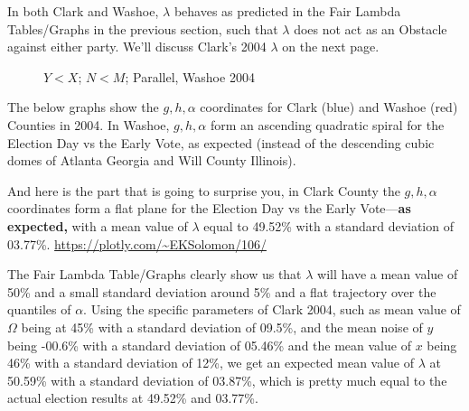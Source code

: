 In both Clark and Washoe, $\lambda$ behaves as predicted in the Fair Lambda Tables/Graphs in the previous section, such that $\lambda$ does not act as an Obstacle against either party. We'll discuss Clark's 2004 $\lambda$ on the next page.
\begin{figure}[bp!]
\begin{center}
\caption{$Y<X$; $N<M$; Parallel, Washoe 2004}
\noindent{}
\end{center}
\end{figure}
\newpage
The below graphs show the $g,h,\alpha$ coordinates for Clark (blue) and Washoe (red) Counties in 2004. In Washoe, $g,h,\alpha$ form an ascending quadratic spiral for the Election Day vs the Early Vote, as expected (instead of the descending cubic domes of Atlanta Georgia and Will County Illinois).

And here is the part that is going to surprise you, in Clark County the $g,h,\alpha$ coordinates form a flat plane for the Election Day vs the Early Vote---\textbf{as expected,} with a mean value of $\lambda$ equal to 49.52\% with a standard deviation of 03.77\%. \url{https://plotly.com/~EKSolomon/106/}

The Fair Lambda Table/Graphs clearly show us that $\lambda$ will have a mean value of 50\% and a small standard deviation around 5\% and a flat trajectory over the quantiles of $\alpha$. Using the specific parameters of Clark 2004, such as mean value of $\Omega$ being at 45\% with a standard deviation of 09.5\%, and the mean noise of $y$ being -00.6\% with a standard deviation of 05.46\% and the mean value of $x$ being 46\% with a standard deviation of 12\%, we get an expected mean value of $\lambda$ at 50.59\% with a standard deviation of 03.87\%, which is pretty much equal to the actual election results at 49.52\% and 03.77\%.

